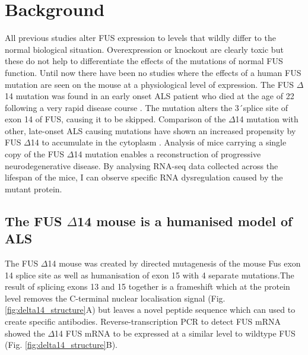 \section{Background}
All previous studies alter FUS expression to levels that wildly differ to the normal biological situation. Overexpression or knockout are clearly toxic but these do not help to differentiate the effects of the mutations of normal FUS function. Until now there have been no studies where the effects of a human FUS mutation are seen on the mouse at a physiological level of expression. 
The FUS $\Delta$14 mutation was found in an early onset ALS patient who died at the age of 22 following a very rapid disease course \citep{DeJesus-Hernandez2010}. The mutation alters the 3\'\ splice site of exon 14 of FUS, causing it to be skipped.  Comparison of the $\Delta$14 mutation with other, late-onset ALS causing mutations have shown an increased propensity by FUS $\Delta$14 to accumulate in the cytoplasm \citep{Verbeeck2012}. Analysis of mice carrying a single copy of the FUS $\Delta$14 mutation enables a reconstruction of progressive neurodegenerative disease. By analysing RNA-seq data collected across the lifespan of the mice, I can observe specific RNA dysregulation caused by the mutant protein.

\subsection{The FUS $\Delta$14 mouse is a humanised model of ALS}
The FUS $\Delta$14 mouse was created by directed mutagenesis of the mouse Fus exon 14 splice site as well as humanisation of exon 15 with 4 separate mutations.The result of splicing exons 13 and 15 together is a frameshift which at the protein level removes the C-terminal nuclear localisation signal (Fig. \ref{fig:delta14_structure}A) but leaves a novel peptide sequence which can used to create specific antibodies. Reverse-transcription PCR to detect FUS mRNA showed the $\Delta$14 FUS mRNA to be expressed at a similar level to wildtype FUS (Fig. \ref{fig:delta14_structure}B). 


